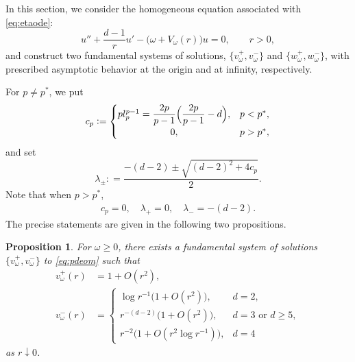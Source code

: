 \documentclass[12pt, a4paper, reqno]{amsart}
\numberwithin{equation}{section}
\newtheorem{proposition}[theorem]{Proposition}
\theoremstyle{definition}
\theoremstyle{remark}
\newcommand{\ce}{\mathrel{\mathop:}=}
\begin{document}
In this section, we consider the homogeneous equation associated with \eqref{eq:etaode}:
\begin{equation} \label{eq:pdeom}
    u''
    +\frac{d-1}{r}u'
    -\bigl(\omega+V_\omega(r)\bigr)u
    =0,\qquad r>0,
\end{equation}
and construct two fundamental systems of solutions, $\{v_\omega^+,v_\omega^-\}$ and $\{w_\omega^+,w_\omega^-\}$, with prescribed asymptotic behavior at the origin and at infinity, respectively.

For $p\ne p^*$, we put
\begin{equation} \label{eq:cp}
    c_p
    \ce \begin{cases}
    pl_p^{p-1}
    =\dfrac{2p}{p-1}\Bigl(\dfrac{2p}{p-1}-d\Bigr), &
    p<p^*,
\\  \hfil 0, &
    p>p^*,
    \end{cases}
\end{equation}
and set
\begin{equation} \label{eq:lambdapm}
    \lambda_\pm
    \ce \frac{-(d-2)\pm\sqrt{(d-2)^2+4c_p}}{2}.
\end{equation}
Note that when $p>p^*$,
\begin{align*}
   c_p=0,\quad
   \lambda_+=0,
   \quad
   \lambda_-=-(d-2).
\end{align*}
The precise statements are given in the following two propositions.

\begin{proposition} \label{prop:vom0}
For $\omega\ge 0$, there exists a fundamental system of solutions $\{v_{\omega}^+, v_{\omega}^-\}$ to \eqref{eq:pdeom} such that
\begin{align*}
    v_{\omega}^+(r)
   &=1+O(r^2),
\\  v_{\omega}^-(r)
   &=\begin{cases}
    \log r^{-1}\bigl(1+O(r^2)\bigr), & d=2,
\\  r^{-(d-2)}\bigl(1+O(r^2)\bigr), & d=3 \text{ or } d\ge 5,
\\  r^{-2}\bigl(1+O(r^2\log r^{-1})\bigr), & d=4
    \end{cases}
\end{align*}
as $r\downarrow 0$.
\end{proposition}
\end{document}
